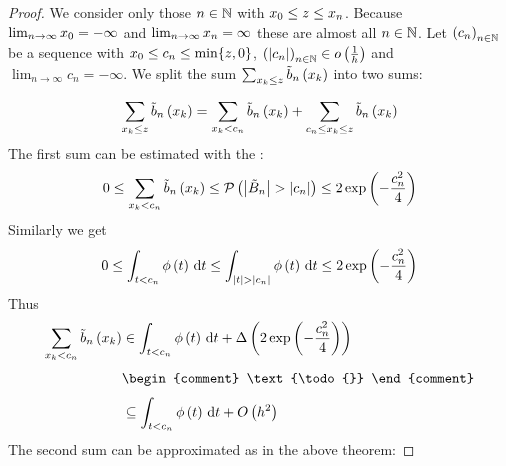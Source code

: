 \begin{proof}
  We consider only those $n\in\N$ with $\x[0] \le z \le \x[n]$. Because $\lim_{n\to\infty} \x[0] = -\infty$ and $\lim_{n\to\infty} \x[n] = \infty$ these are almost all $n\in\N$. Let $\seq{c_n}$ be a sequence with $\x[0] \le c_n \le \min\{z,0\}$, $\seq{\abs{c_n}}\in\littleo{\frac 1h}$ and $\lim_{n\to\infty} c_n=-\infty$. We split the sum $\sum_{\x \le z} \bb{\x}$ into two sums:

  \begin{align}
    \sum_{\x \le z} \bb{\x} = \sum_{\x < c_n} \bb{\x} + \sum_{c_n \le \x \le z} \bb{\x}
  \end{align}
  The first sum can be estimated with the :
  \begin{align}
    0 \le \sum_{\x < c_n} \bb{\x} \le \P{\abs{\BBs} > \abs{c_n}} \le 2\fexp{-\frac{c_n^2}{4}}
  \end{align}
  Similarly we get
  \begin{align}
    0 \le \int_{t < c_n} \fphi{t}\d{t} \le \int_{\abs{t} > \abs{c_n}} \fphi{t} \d{t} \le 2\fexp{-\frac{c_n^2}{4}}
  \end{align}
  Thus
  \begin{align}
    \sum_{\x < c_n} \bb{\x} & \in \int_{t < c_n} \fphi{t}\d{t} + \bigabs{2\fexp{-\frac{c_n^2}4}} \nl
    &
    \begin{comment}
      \text{\todo{}} 
    \end{comment} \nl
    & \subseteq \int_{t < c_n} \fphi{t}\d{t} + \bigo{h^2}
  \end{align}
  The second sum can be approximated as in the above theorem:

\end{proof}
